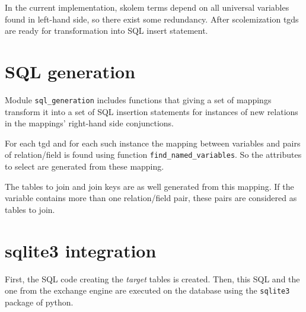 \documentclass[a4paper,11pt]{article}
\begin{document}
In the current implementation, skolem terms depend on all universal variables found in left-hand side, so there exist some redundancy. After scolemization tgds are ready for transformation into SQL insert statement.

\section{SQL generation}
Module \texttt{sql\_generation} includes functions that giving a set of mappings transform it into a set of SQL insertion statements for instances of new relations in the mappings' right-hand side conjunctions.

For each tgd and for each such instance the mapping between variables and pairs of relation/field is found using function \texttt{find\_named\_variables}. So the attributes to select are generated from these mapping.

The tables to join and join keys are as well generated from this mapping. If the variable contains more than one relation/field pair, these pairs are considered as tables to join.

\section{sqlite3 integration}
First, the SQL code creating the \textit{target} tables is created. Then, this SQL and the one from the exchange engine are executed on the database using the \texttt{sqlite3} package of python. 
\end{document}
